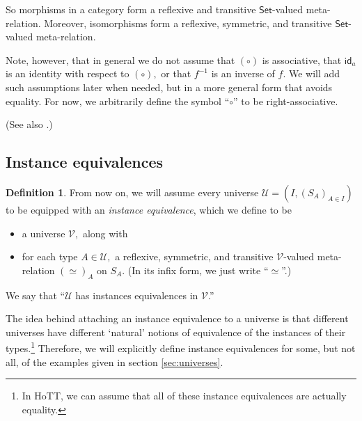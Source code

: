 \documentclass[a4paper]{article}
\theoremstyle{definition}
\newtheorem{definition}{Definition}[section]
\theoremstyle{remark}
\newcommand{\defn}{\emph}
\renewcommand{\equiv}{\simeq}
\newcommand{\U}{\mathcal{U}}
\newcommand{\V}{\mathcal{V}}
\newcommand{\nm}{\mathsf}
\newcommand{\universe}{\nm}
\newcommand{\Set}{\universe{Set}}
\newcommand{\id}{\nm{id}}
\begin{document}
So morphisms in a category form a reflexive and transitive $\Set$-valued meta-relation.
Moreover, isomorphisms form a reflexive, symmetric, and transitive $\Set$-valued meta-relation.

Note, however, that in general we do not assume that $(\circ)$ is associative, that $\id_a$ is
an identity with respect to $(\circ),$ or that $f^{-1}$ is an inverse of $f.$ We will add such
assumptions later when needed, but in a more general form that avoids equality. For now, we
arbitrarily define the symbol ``$\circ$'' to be right-associative.

(See also \cite{HoTT-eq}.)

\subsection{Instance equivalences}

\begin{definition}
  From now on, we will assume every universe $\U = (I, (S_A)_{A \in I})$ to be equipped with an
  \defn{instance equivalence}, which we define to be
  \begin{itemize}
    \item a universe $\V,$ along with
    \item for each type $A \in \U,$ a reflexive, symmetric, and transitive $\V$-valued
    meta-relation $(\equiv)_A$ on $S_A.$ (In its infix form, we just write ``$\equiv$''.)
  \end{itemize}
\end{definition}

We say that ``$\U$ has instances equivalences in $\V$.''

The idea behind attaching an instance equivalence to a universe is that different universes
have different `natural' notions of equivalence of the instances of their
types.\footnote{In HoTT, we can assume that all of these instance equivalences are actually
equality.} Therefore, we will explicitly define instance equivalences for some, but not all,
of the examples given in section \ref{sec:universes}.
\end{document}
